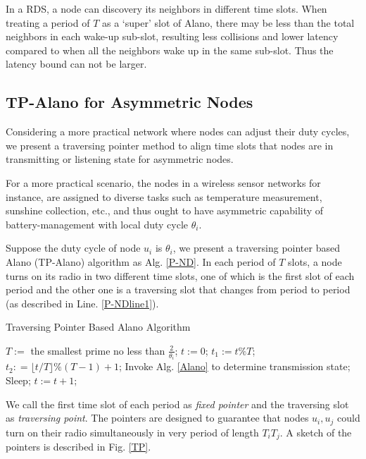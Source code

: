 \begin{remark}
In a RDS, a node can discovery its neighbors in different time slots. When treating a period of $T$ as a  `super' slot of Alano, 
there may be less than the total neighbors in each wake-up sub-slot,
resulting less collisions and lower latency compared to when all the neighbors wake up in the same sub-slot.
Thus the latency bound can not be larger.
\end{remark}


\subsection{TP-Alano for Asymmetric Nodes}


Considering a more practical network where nodes can adjust their duty cycles, we present a traversing pointer method to align time slots that nodes are in transmitting or listening state for asymmetric nodes.


For a more practical scenario, the nodes in a wireless sensor networks
for instance, are assigned to diverse tasks such as temperature measurement,
sunshine collection, etc., and thus ought to have asymmetric capability of
battery-management with local duty cycle $\theta_i$.

Suppose the duty cycle of node $u_i$ is $\theta_i$, we present a traversing pointer based Alano (TP-Alano) algorithm as Alg. \ref{P-ND}.
In each period of $T$ slots, a node turns on its radio in two different time slots, one of which is the
first slot of each period and the other one is a traversing slot that changes from period to period (as described in Line. \ref{P-NDline1}).

\begin{algorithm}[!h]
\caption{Traversing Pointer Based Alano Algorithm}
\label{P-ND}
\begin{algorithmic}[1]
\STATE $T :=$ the smallest prime no less than $\frac{2}{\theta_i}$; $t := 0$;
	\STATE $t_1 := t \% T$;
	\STATE $t_2 : =\lfloor t / T \rfloor \% (T - 1) +1$;\label{P-NDline1}
    		\STATE Invoke Alg. \ref{Alano} to determine transmission state;
	\ELSE
    		\STATE Sleep;
	\ENDIF
	\STATE $t := t + 1$;
\ENDWHILE
\end{algorithmic}
\end{algorithm}

We call the first time slot of each period as \emph{fixed pointer} and the traversing
slot as \emph{traversing point}. The pointers are designed to guarantee that nodes $u_i, u_j$
could turn on their radio simultaneously in very period of length $T_i T_j$. A sketch of the pointers is described in Fig. \ref{TP}.

